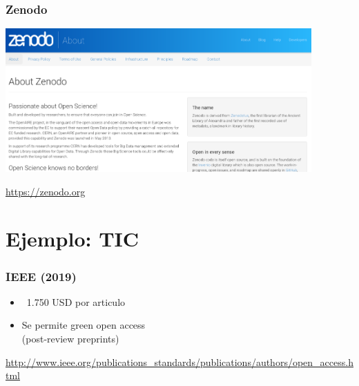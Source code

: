 \documentclass[17pt,aspectratio=169]{beamer}
\begin{document}
\begin{frame}
\frametitle{Zenodo}

\begin{center}
  \includegraphics[height=5.5cm]{figs/zenodo}
\end{center}  

\begin{flushright}
{\small \url{https://zenodo.org}}
\end{flushright}

\end{frame}

\section{Ejemplo: TIC}

\begin{frame}
\frametitle{IEEE (2019)}

\begin{itemize}
\item ~1.750 USD por articulo
\item Se permite green open access \\
  (post-review preprints) \\
\end{itemize}

\begin{flushright}
{\footnotesize \url{http://www.ieee.org/publications_standards/publications/authors/open_access.html}}
\end{flushright}

\end{frame}
\end{document}
